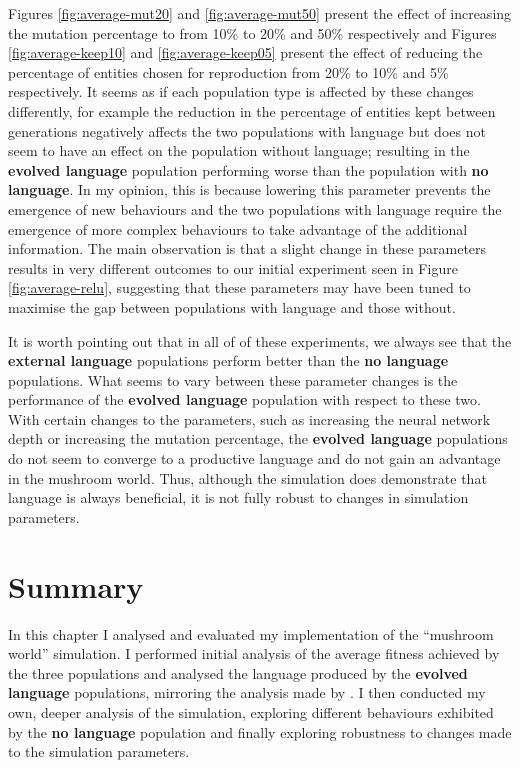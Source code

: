 \documentclass[12pt,a4paper]{report}
\begin{document}
Figures \ref{fig:average-mut20} and \ref{fig:average-mut50} present the effect of increasing the mutation percentage to from 10\% to 20\% and 50\% respectively and Figures \ref{fig:average-keep10} and \ref{fig:average-keep05} present the effect of reducing the percentage of entities chosen for reproduction from 20\% to 10\% and 5\% respectively. It seems as if each population type is affected by these changes differently, for example the reduction in the percentage of entities kept between generations negatively affects the two populations with language but does not seem to have an effect on the population without language; resulting in the {\bf evolved language} population performing worse than the population with {\bf no language}. In my opinion, this is because lowering this parameter prevents the emergence of new behaviours and the two populations with language require the emergence of more complex behaviours to take advantage of the additional information. The main observation is that a slight change in these parameters results in very different outcomes to our initial experiment seen in Figure \ref{fig:average-relu}, suggesting that these parameters may have been tuned to maximise the gap between populations with language and those without.

It is worth pointing out that in all of of these experiments, we always see that the {\bf external language} populations perform better than the {\bf no language} populations. What seems to vary between these parameter changes is the performance of the {\bf evolved language} population with respect to these two. With certain changes to the parameters, such as increasing the neural network depth or increasing the mutation percentage, the {\bf evolved language} populations do not seem to converge to a productive language and do not gain an advantage in the mushroom world. Thus, although the simulation does demonstrate that language is always beneficial, it is not fully robust to changes in simulation parameters.

 \section{Summary}
 
 In this chapter I analysed and evaluated my implementation of the ``mushroom world'' simulation. I performed initial analysis of the average fitness achieved by the three populations and analysed the language produced by the {\bf evolved language} populations, mirroring the analysis made by \citet{Cangelosi1998}. I then conducted my own, deeper analysis of the simulation, exploring different behaviours exhibited by the {\bf no language} population and finally exploring robustness to changes made to the simulation parameters.
\end{document}
